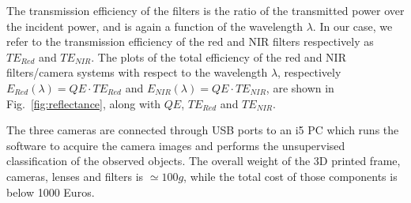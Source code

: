 \documentclass[a4paper, 10pt, conference]{ieeeconf}      %
\begin{document}
The transmission efficiency of the filters is the ratio of the transmitted power over the incident power, and is again a function of the wavelength $\lambda$. In our case, we refer to the transmission efficiency of the red and NIR filters respectively as ${TE}_{Red}$ and  $TE_{NIR}$.
The plots of the total efficiency of the red and NIR filters/camera systems with respect to the wavelength $\lambda$, respectively $E_{Red}(\lambda)=QE\cdot TE_{Red}$ and $E_{NIR}(\lambda)=QE \cdot TE_{NIR}$, are shown in Fig.~\ref{fig:reflectance}, along with $QE$, $TE_{Red}$ and  $TE_{NIR}$.



The three cameras are connected through USB ports to an i5 PC which runs the software to acquire the camera images and performs the unsupervised classification of the observed objects.
The overall weight of the 3D printed frame, cameras, lenses and filters is $\simeq100g$, while the total cost of those components is below 1000 Euros.
\end{document}
